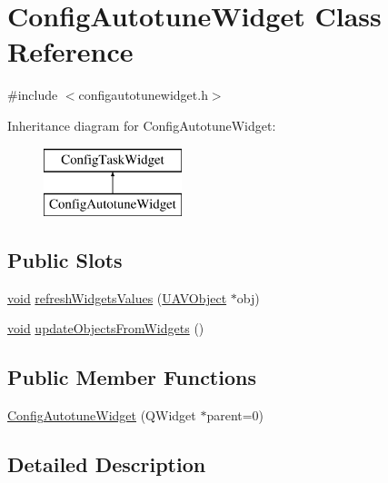 \hypertarget{class_config_autotune_widget}{\section{\-Config\-Autotune\-Widget \-Class \-Reference}
\label{class_config_autotune_widget}
}


{\ttfamily \#include $<$configautotunewidget.\-h$>$}

\-Inheritance diagram for \-Config\-Autotune\-Widget\-:\begin{figure}[H]
\begin{center}
\leavevmode
\includegraphics[height=2.000000cm]{class_config_autotune_widget}
\end{center}
\end{figure}
\subsection*{\-Public \-Slots}
\begin{DoxyCompactItemize}
\item 
\hyperlink{group___u_a_v_objects_plugin_ga444cf2ff3f0ecbe028adce838d373f5c}{void} \hyperlink{group___config_plugin_ga7a345485561483fc0d3252acc34f65cd}{refresh\-Widgets\-Values} (\hyperlink{class_u_a_v_object}{\-U\-A\-V\-Object} $\ast$obj)
\item 
\hyperlink{group___u_a_v_objects_plugin_ga444cf2ff3f0ecbe028adce838d373f5c}{void} \hyperlink{group___config_plugin_ga20c0a1a9487c7f461a6ea095fac93098}{update\-Objects\-From\-Widgets} ()
\end{DoxyCompactItemize}
\subsection*{\-Public \-Member \-Functions}
\begin{DoxyCompactItemize}
\item 
\hyperlink{group___config_plugin_ga989f53fb20055f01ad3e2b5b08a6103f}{\-Config\-Autotune\-Widget} (\-Q\-Widget $\ast$parent=0)
\end{DoxyCompactItemize}


\subsection{\-Detailed \-Description}


